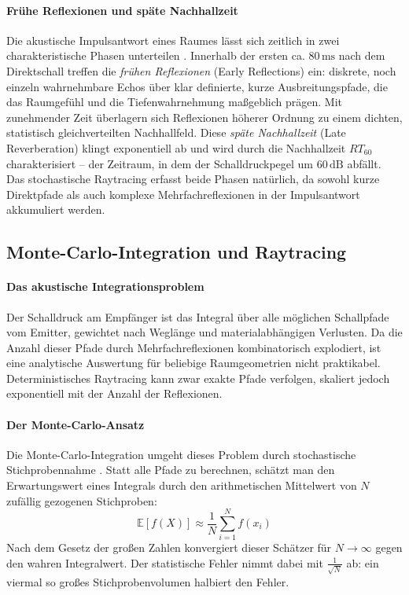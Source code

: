 \paragraph{Frühe Reflexionen und späte Nachhallzeit}

Die akustische Impulsantwort eines Raumes lässt sich zeitlich in zwei charakteristische Phasen unterteilen \parencite{kuttruff2016}.
Innerhalb der ersten ca. $80\,\text{ms}$ nach dem Direktschall treffen die \emph{frühen Reflexionen} (Early Reflections) ein: diskrete, noch einzeln wahrnehmbare Echos über klar definierte, kurze Ausbreitungspfade, die das Raumgefühl und die Tiefenwahrnehmung maßgeblich prägen.
Mit zunehmender Zeit überlagern sich Reflexionen höherer Ordnung zu einem dichten, statistisch gleichverteilten Nachhallfeld. Diese \emph{späte Nachhallzeit} (Late Reverberation) klingt exponentiell ab und wird durch die Nachhallzeit $RT_{60}$ charakterisiert -- der Zeitraum, in dem der Schalldruckpegel um $60\,\text{dB}$ abfällt.
Das stochastische Raytracing erfasst beide Phasen natürlich, da sowohl kurze Direktpfade als auch komplexe Mehrfachreflexionen in der Impulsantwort akkumuliert werden.


\subsection{Monte-Carlo-Integration und Raytracing}
\label{subsec:montecarlo}

\paragraph{Das akustische Integrationsproblem}

Der Schalldruck am Empfänger ist das Integral über alle möglichen Schallpfade vom Emitter, gewichtet nach Weglänge und materialabhängigen Verlusten. Da die Anzahl dieser Pfade durch Mehrfachreflexionen kombinatorisch explodiert, ist eine analytische Auswertung für beliebige Raumgeometrien nicht praktikabel. Deterministisches Raytracing kann zwar exakte Pfade verfolgen, skaliert jedoch exponentiell mit der Anzahl der Reflexionen.

\paragraph{Der Monte-Carlo-Ansatz}

Die Monte-Carlo-Integration umgeht dieses Problem durch stochastische Stichprobennahme \parencite{pharr2023}.
Statt alle Pfade zu berechnen, schätzt man den Erwartungswert eines Integrals durch den arithmetischen Mittelwert von $N$ zufällig gezogenen Stichproben:
\[\mathbb{E}[f(X)] \approx \frac{1}{N} \sum_{i=1}^{N} f(x_i)\]
Nach dem Gesetz der großen Zahlen konvergiert dieser Schätzer für $N \to \infty$ gegen den wahren Integralwert.
Der statistische Fehler nimmt dabei mit $\frac{1}{\sqrt{N}}$ ab: ein viermal so großes Stichprobenvolumen halbiert den Fehler.

